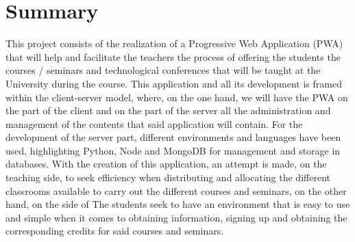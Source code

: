 \documentclass[a4paper, 12pt]{book}
\begin{document}

\chapter*{Summary}

This project consists of the realization of a Progressive Web Application (PWA) that will help and facilitate the teachers the process of offering the students the courses / seminars and technological conferences that will be taught at the University during the course.
This application and all its development is framed within the client-server model, where, on the one hand, we will have the PWA on the part of the client and on the part of the server all the administration and management of the contents that said application will contain.
For the development of the server part, different environments and languages have been used, highlighting Python, Node and MongoDB for management and storage in databases.
With the creation of this application, an attempt is made, on the teaching side, to seek efficiency when distributing and allocating the different classrooms available to carry out the different courses and seminars, on the other hand, on the side of The students seek to have an environment that is easy to use and simple when it comes to obtaining information, signing up and obtaining the corresponding credits for said courses and seminars.




\tableofcontents 
\cleardoublepage
\listoffigures %
\end{document}
